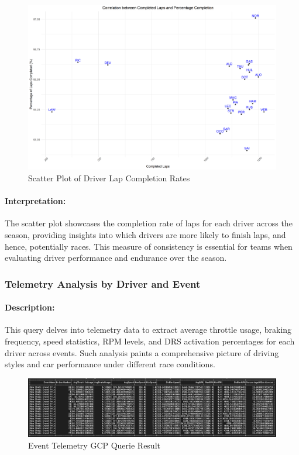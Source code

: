 \documentclass{article}
\begin{document}
\begin{figure}[H]
    \centering
    \includegraphics[width=\textwidth]{driver_lap_completion_scatter_plot.png}
    \caption{Scatter Plot of Driver Lap Completion Rates}
\end{figure}

\paragraph{Interpretation:}
The scatter plot showcases the completion rate of laps for each driver across the season, providing insights into which drivers are more likely to finish laps, and hence, potentially races. This measure of consistency is essential for teams when evaluating driver performance and endurance over the season.

\subsubsection{Telemetry Analysis by Driver and Event}
\paragraph{Description:}
This query delves into telemetry data to extract average throttle usage, braking frequency, speed statistics, RPM levels, and DRS activation percentages for each driver across events. Such analysis paints a comprehensive picture of driving styles and car performance under different race conditions.

\begin{figure}[H]
    \centering
    \includegraphics[width=\textwidth]{telemetry.png}
    \caption{Event Telemetry GCP Querie Result}
\end{figure}
\end{document}

